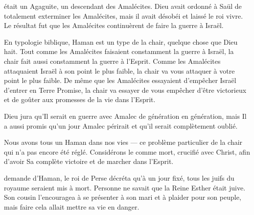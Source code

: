  était un Agaguite, un descendant des Amalécites.
 Dieu avait ordonné à Saül de totalement exterminer les Amalécites,
 mais il avait désobéi et laissé le roi vivre.
 Le résultat fut que les Amalécites continuèrent de faire la guerre à Israël.

En typologie
 biblique, Haman est un type de la chair,
 quelque chose que Dieu hait.
 Tout comme les Amalécites faisaient constamment la guerre à Israël,
 la chair fait aussi constamment la guerre à l'Esprit.
 Comme les Amalécites attaquaient Israël à son point le plus faible,
 la chair va vous attaquer à votre point le plus faible.
 De même que les Amalécites essayaient d'empêcher Israël
 d'entrer en Terre Promise, la chair va essayer de vous empêcher
 d'être victorieux et de goûter aux promesses de la vie dans l'Esprit.

Dieu jura qu'Il serait en guerre avec Amalec de génération en génération,
 mais Il a aussi promis qu'un jour Amalec périrait et
 qu'il serait complètement oublié.


Nous avons tous un Haman dans nos vies --- ce problème particulier de la chair
 qui n'a pas encore été réglé.
 Considérons le comme mort, crucifié avec Christ,
 afin d'avoir Sa complète victoire et de marcher dans l'Esprit.

\dvrule







 demande d'Haman, le roi de Perse décréta qu'à un jour fixé,
 tous les juifs du royaume seraient mis à mort.
 Personne ne savait que la Reine Esther était juive.
 Son cousin l'encouragea à se présenter à son mari et à plaider pour son peuple,
 mais faire cela allait mettre sa vie en danger.

